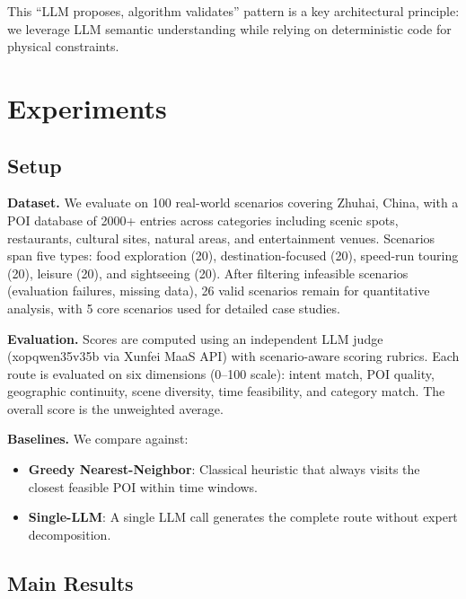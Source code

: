 \documentclass[11pt]{article}
\begin{document}
This ``LLM proposes, algorithm validates'' pattern is a key architectural principle: we leverage LLM semantic understanding while relying on deterministic code for physical constraints.

\section{Experiments}

\subsection{Setup}

\textbf{Dataset.} We evaluate on 100 real-world scenarios covering Zhuhai, China, with a POI database of 2000+ entries across categories including scenic spots, restaurants, cultural sites, natural areas, and entertainment venues. Scenarios span five types: food exploration (20), destination-focused (20), speed-run touring (20), leisure (20), and sightseeing (20). After filtering infeasible scenarios (evaluation failures, missing data), 26 valid scenarios remain for quantitative analysis, with 5 core scenarios used for detailed case studies.

\textbf{Evaluation.} Scores are computed using an independent LLM judge (xopqwen35v35b via Xunfei MaaS API) with scenario-aware scoring rubrics. Each route is evaluated on six dimensions (0--100 scale): intent match, POI quality, geographic continuity, scene diversity, time feasibility, and category match. The overall score is the unweighted average.

\textbf{Baselines.} We compare against:
\begin{itemize}[leftmargin=*]
    \item \textbf{Greedy Nearest-Neighbor}: Classical heuristic that always visits the closest feasible POI within time windows.
    \item \textbf{Single-LLM}: A single LLM call generates the complete route without expert decomposition.
\end{itemize}

\subsection{Main Results}
\end{document}
